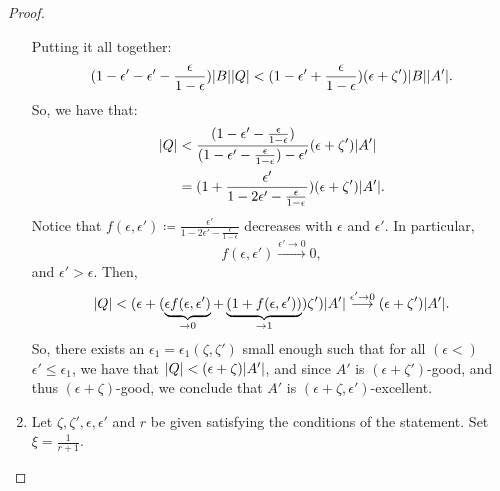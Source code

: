 \begin{lemma}
\begin{proof}
\begin{enumerate}[label=(\alph*), ref=\alph*]
                    Putting it all together:
                    \[
                        ( 1 - \epsilon' - \epsilon' - \frac{\epsilon}{1 - \epsilon} ) | B | | Q | <
                        ( 1 - \epsilon' + \frac{\epsilon}{1 - \epsilon} ) ( \epsilon + \zeta' ) | B | | A' |.
                    \]
                    So, we have that:
                    \begin{align*}
                        | Q | & < \frac{( 1 - \epsilon' - \frac{\epsilon}{1 - \epsilon} )}
                                            {( 1 - \epsilon' - \frac{\epsilon}{1 - \epsilon} ) - \epsilon'}
                                            ( \epsilon + \zeta' ) | A' | \\
                                        & = ( 1 + \frac{\epsilon'}{1 - 2\epsilon' - \frac{\epsilon}{1 - \epsilon}} )
                                            (\epsilon + \zeta') |A'|.
                    \end{align*}
                    Notice that $f(\epsilon, \epsilon') \coloneqq \frac{\epsilon'}{1 - 2\epsilon' - \frac{\epsilon}{1 - \epsilon}}$
                    decreases with $\epsilon$ and $\epsilon'$.
                    In particular,
                    \[
                        f(\epsilon, \epsilon') \overset{\epsilon' \to 0}{\longrightarrow} 0,
                    \]
                    and $\epsilon' > \epsilon$.
                    Then,
                    \[
                        | Q | < ( \epsilon + ( \underbrace{\epsilon f(\epsilon, \epsilon')}_{\to 0} +
                        \underbrace{( 1 + f(\epsilon, \epsilon') )}_{\to 1} ) \zeta' ) |A'|
                        \overset{\epsilon' \to 0}{\longrightarrow} ( \epsilon + \zeta' ) |A'|.
                    \]
                    So, there exists an $\epsilon_1 = \epsilon_1(\zeta, \zeta')$ small enough such that for all
                    $(\epsilon <)$ $\epsilon' \leq \epsilon_1$, we have that $| Q | < ( \epsilon + \zeta ) |A'|$,
                    and since $A'$ is $(\epsilon + \zeta')$-good, and thus $(\epsilon + \zeta)$-good, we conclude that
                    $A'$ is $(\epsilon + \zeta, \epsilon')$-excellent. 
                \item Let $\zeta, \zeta', \epsilon, \epsilon'$ and $r$ be given satisfying the conditions of the statement.
                    Set $\xi = \frac{1}{r + 1}$.

\end{enumerate}
\end{proof}
\end{lemma}
